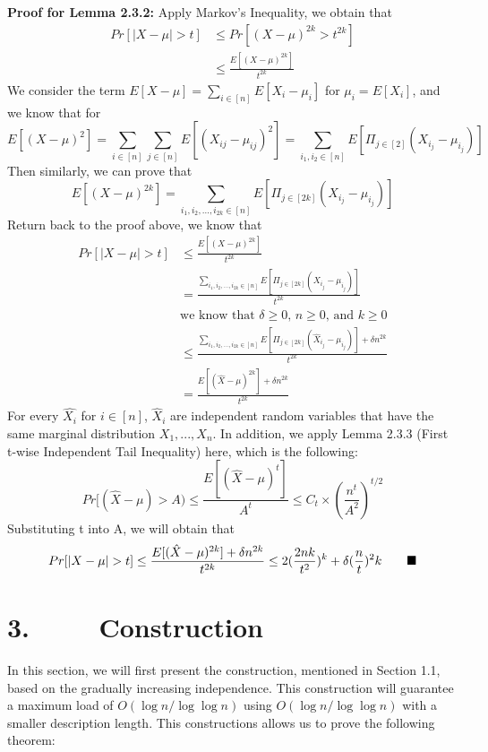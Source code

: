 \documentclass[a4paper, english]{paper}
\begin{document}
	
	 \noindent\textbf{Proof for Lemma 2.3.2:} Apply Markov's Inequality, we obtain that
	 \begin{align*}
	 	Pr\left[|X - \mu| > t\right]  &\le Pr\left[\left(X - \mu\right)^{2k} > t^{2k}\right]\\
	 	& \le \frac{E[(X-\mu)^{2k}]}{t^{2k}}
	\end{align*}
	We consider the term $E[X-\mu]=\sum_{i\in[n]} E[X_i - \mu_i]$ for $\mu_i = E[X_i]$, and we know that for 
	$$E[(X-\mu)^2] = \sum_{i \in [n]} \sum_{j \in [n]} E[(X_{ij} - \mu_{ij})^2]=\sum_{i_1, i_2 \in [n]} E[\Pi_{j \in [2]}(X_{i_j}-\mu_{i_j})]$$
	Then similarly, we can prove that 
	$$E[(X-\mu)^{2k}] = \sum_{i_1, i_2, ..., i_{2k} \in [n]} E[\Pi_{j \in [2k]}(X_{i_j}-\mu_{i_j})]$$
	Return back to the proof above, we know that 
	\begin{align*}
	 	Pr\left[|X - \mu| > t\right]  & \le \frac{E[(X-\mu)^{2k}]}{t^{2k}} \\
		&= \frac{\sum_{i_1, i_2, ..., i_{2k} \in [n]} E[\Pi_{j \in [2k]}(X_{i_j}-\mu_{i_j})]}{t^{2k}} \\
		& \text{we know that $\delta \ge 0$, $n \ge 0$, and $k \ge 0$} \\
		& \le \frac{\sum_{i_1, i_2, ..., i_{2k} \in [n]} E[\Pi_{j \in [2k]}(\hat{X}_{i_j}-\mu_{i_j})] + \delta n^{2k}}{t^{2k}} \\
		& = \frac{E[(\hat{X}-\mu)^{2k}] + \delta n^{2k}}{t^{2k}}
	 \end{align*}
	 For every $\hat{X_i}$ for $i \in [n]$, $\hat{X}_i$ are independent random variables that have the same marginal distribution $X_1, ..., X_n$. In addition, we apply Lemma 2.3.3 (First t-wise Independent Tail Inequality) here, which is the following: 
	 $$ Pr[(\hat{X}-\mu) > A) \le \frac{E[(\hat{X}-\mu)^t]}{A^t} \le C_t \times (\frac{n^t}{A^2})^{t/2} $$ 
	 Substituting t into A, we will obtain that
	 $$ Pr[|X - \mu| > t] \le \frac{E[(\hat{X}-\mu)^{2k}] + \delta n^{2k}}{t^{2k}} \le 2(\frac{2nk}{t^2})^k + \delta (\frac{n}{t})^2k \qquad \hfill\blacksquare$$ 
		
	\section{3. $\qquad$ Construction}
	In this section, we will first present the construction, mentioned in Section 1.1, based on the gradually increasing independence. This construction will guarantee a maximum load of  $O(\log n/\log\log n)$ using $O(\log n/\log\log n)$ with a smaller description length. This constructions allows us to prove the following theorem: \\
	
\end{document}
